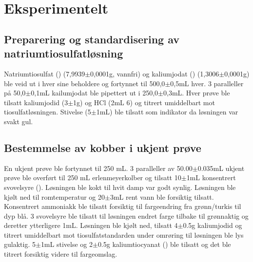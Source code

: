 \section{Eksperimentelt}

\subsection{Preparering og standardisering av natriumtiosulfatløsning}

Natriumtiosulfat () (7,9939$\pm$0,0001\si{\gram}, vannfri) og kaliumjodat () (1,3006$\pm$0,0001\si{\gram}) ble veid ut i hver sine beholdere og fortynnet til 500,0$\pm$0,5\si{\milli\liter} hver. 3 paralleller på 50,0$\pm$0,1\si{\milli\liter} kailumjodat ble pipettert ut i 250,0$\pm$0,3\si{\milli\liter}. Hver prøve ble tilsatt kaliumjodid (3$\pm$1\si{\gram}) og HCl (2\si{\milli\liter} 6\si{\molar}) og titrert umiddelbart mot tiosulfatløsningen. Stivelse (5$\pm$1\si{\milli\liter}) ble tilsatt som indikator da løsningen var svakt gul.


\subsection{Bestemmelse av kobber i ukjent prøve}

En ukjent prøve ble fortynnet til 250 mL. 3 paralleller av 50.00$\pm$0.035\si{\milli\liter} ukjent prøve ble overført til 250 mL erlenmeyerkolber og tilsatt 10$\pm$1\si{\milli\liter} konsentrert svovelsyre (). Løsningen ble kokt til hvit  damp var godt synlig. Løsningen ble kjølt ned til romtemperatur og 20$\pm$3\si{\milli\liter} rent vann ble forsiktig tilsatt. Konsentrert ammoniakk ble tilsatt forsiktig til fargeendring fra grønn/turkis til dyp blå. 3\si{\molar} svovelsyre ble tilsatt til løsningen endret farge tilbake til grønnaktig og deretter ytterligere 1\si{\milli\liter}. Løsningen ble kjølt ned, tilsatt 4$\pm$0.5\si{\gram} kaliumjodid og titrert umiddelbart mot tiosulfatstandarden under omrøring til løsningen ble lys gulaktig. 5$\pm$1\si{\milli\liter} stivelse og 2$\pm$0.5\si{\gram} kaliumtiocyanat () ble tilsatt og det ble titrert forsiktig videre til fargeomslag.
